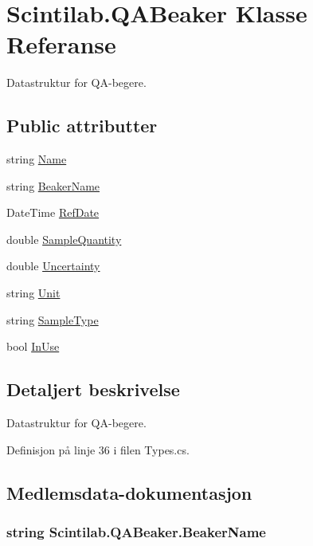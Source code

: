\hypertarget{class_scintilab_1_1_q_a_beaker}{\section{Scintilab.\+Q\+A\+Beaker Klasse Referanse}
\label{class_scintilab_1_1_q_a_beaker}
}


Datastruktur for Q\+A-\/begere.  


\subsection*{Public attributter}
\begin{DoxyCompactItemize}
\item 
string \hyperlink{class_scintilab_1_1_q_a_beaker_a4c861b979110028997c65fd9b66b74b0}{Name}
\item 
string \hyperlink{class_scintilab_1_1_q_a_beaker_a136323019ece2a8186164be5a55905f4}{Beaker\+Name}
\item 
Date\+Time \hyperlink{class_scintilab_1_1_q_a_beaker_a01e931ad4f82802f249bc3c7e0ad6e70}{Ref\+Date}
\item 
double \hyperlink{class_scintilab_1_1_q_a_beaker_a107adf07288296cf83dc2bfc5def9284}{Sample\+Quantity}
\item 
double \hyperlink{class_scintilab_1_1_q_a_beaker_ac707f692dff62a12864abf366abb44d7}{Uncertainty}
\item 
string \hyperlink{class_scintilab_1_1_q_a_beaker_a9624cfb3bb98340b96370e255b04a1a2}{Unit}
\item 
string \hyperlink{class_scintilab_1_1_q_a_beaker_af2ac680964020fb89f416fd2ceb13174}{Sample\+Type}
\item 
bool \hyperlink{class_scintilab_1_1_q_a_beaker_ab9e60a2388f98a2dd836a8242b2b5d0d}{In\+Use}
\end{DoxyCompactItemize}


\subsection{Detaljert beskrivelse}
Datastruktur for Q\+A-\/begere. 

Definisjon på linje 36 i filen Types.\+cs.



\subsection{Medlemsdata-\/dokumentasjon}
\hypertarget{class_scintilab_1_1_q_a_beaker_a136323019ece2a8186164be5a55905f4}{
\subsubsection[{Beaker\+Name}]{\setlength{\rightskip}{0pt plus 5cm}string Scintilab.\+Q\+A\+Beaker.\+Beaker\+Name}}\label{class_scintilab_1_1_q_a_beaker_a136323019ece2a8186164be5a55905f4}


